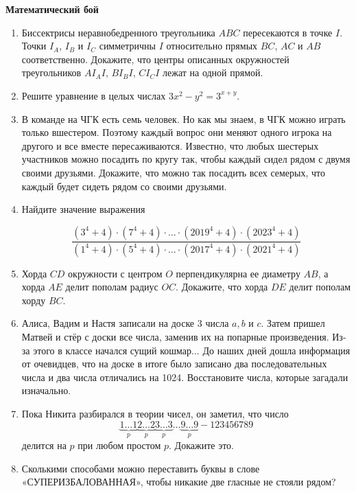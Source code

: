 \documentclass{article}
\begin{document}
\large
	

\begin{center}
\textbf{Математический бой }
\end{center}

\begin{enumerate}

\item Биссектрисы неравнобедренного треугольника $ABC$ пересекаются в точке $I$. Точки $I_A$, $I_B$ и $I_C$ симметричны $I$ относительно прямых $BC$, $AC$ и $AB$ соответственно. Докажите, что центры описанных окружностей треугольников $AI_AI$, $BI_BI$, $CI_CI$ лежат на одной прямой.

\item Решите уравнение в целых числах $3x^2 - y^2 = 3^{x+y}.$


\item В команде на ЧГК есть семь человек. Но как мы знаем, в ЧГК можно играть только вшестером. Поэтому каждый вопрос они меняют одного игрока на другого и все вместе пересаживаются. Известно, что любых шестерых участников можно посадить по кругу так, чтобы каждый сидел рядом с двумя своими друзьями. Докажите, что можно так посадить всех семерых, что каждый будет сидеть рядом со своими друзьями.

\item Найдите значение выражения

$$\frac{(3^4+4)\cdot(7^4+4)\cdot\dotsc\cdot(2019^4+4)\cdot(2023^4+4)}{(1^4+4)\cdot(5^4+4)\cdot\dotsc\cdot(2017^4+4)\cdot(2021^4+4)}$$

\item Хорда $CD$ окружности с центром $O$ перпендикулярна ее диаметру $AB$, а хорда $AE$ делит пополам радиус $OC$. Докажите, что хорда $DE$ делит пополам хорду $BC.$

\item Алиса, Вадим и Настя записали на доске 3 числа $a, b$ и $c$. Затем пришел Матвей и стёр с доски все числа, заменив их на попарные произведения. Из-за этого в классе начался сущий кошмар... До наших дней дошла информация от очевидцев, что на доске в итоге было записано два последовательных числа и два числа отличались на 1024. Восстановите числа, которые загадали изначально.

\item Пока Никита разбирался в теории чисел, он заметил, что число $$\underbrace{1\dotsc1}_{p}\underbrace{2\dotsc2}_{p}\underbrace{3\dotsc3}_{p}\dotsc \underbrace{9\dotsc9}_{p} - 123456789$$ делится на $p$ при любом простом $p$. Докажите это.

\item Сколькими способами можно переставить буквы в слове «СУПЕРИЗБАЛОВАННАЯ», чтобы никакие две гласные не стояли рядом? 

\end{enumerate}
\end{document}
